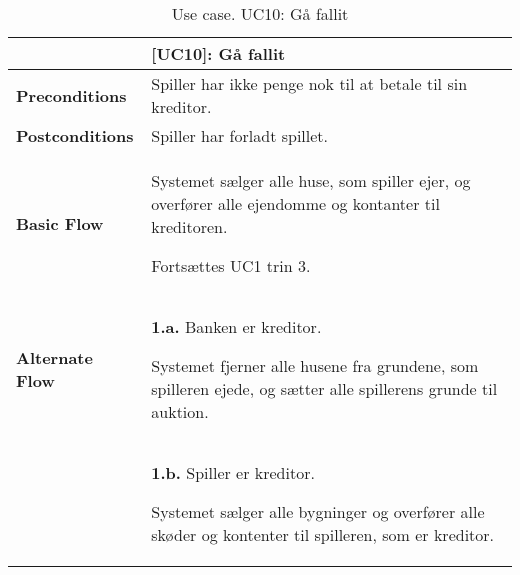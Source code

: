 \documentclass[class=article, crop=false]{standalone}
\begin{document}
    \begin{table}[H]
        \caption{Use case. UC10: Gå fallit}
        \begin{tabularx}{\textwidth}{|l|X|}
            \hline
            & \textbf{[UC10]: Gå fallit}   \\ \hline
            \textbf{Preconditions}       & Spiller har ikke penge nok til at betale til sin kreditor.\\ \hline
            \textbf{Postconditions}      & Spiller har forladt spillet. \\ \hline


            \textbf{Basic Flow} & \begin{tabenum}
                                      \item Systemet sælger alle huse, som spiller ejer, og overfører alle ejendomme og kontanter til kreditoren.
                                      \item Fortsættes UC1 trin 3.
            \end{tabenum}   \\ \hline




            \textbf{Alternate Flow}   & \textbf{1.a.} Banken er kreditor.
            \begin{enumerate} \begin{tabenum}
                                  \item Systemet fjerner alle husene fra grundene, som spilleren ejede, og sætter alle spillerens grunde til auktion.
            \end{tabenum} \end{enumerate}
            \\


                                    & \textbf{1.b.} Spiller er kreditor.
            \begin{enumerate} \begin{tabenum}
                                  \item Systemet sælger alle bygninger og overfører alle skøder og kontenter til spilleren, som er kreditor.
            \end{tabenum} \end{enumerate}
            \\



            \hline

        \end{tabularx}


    \end{table}
\end{document}
